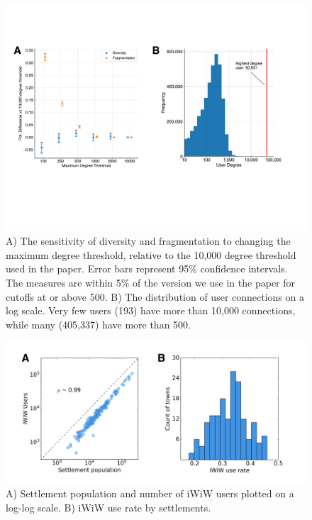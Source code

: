 \begin{figure}[b]
\centering
  \includegraphics[width=\textwidth]{images/iwiw/robustness_tests.pdf}
  \caption[Sensitivity of social capital network measures to thresholds.]{A) The sensitivity of diversity and fragmentation to changing the maximum degree threshold, relative to the 10,000 degree threshold used in the paper. Error bars represent 95\% confidence intervals. The measures are within 5\% of the version we use in the paper for cutoffs at or above 500. B) The distribution of user connections on a log scale. Very few users (193) have more than 10,000 connections, while many (405,337) have more than 500.}
  \label{fig:iwiw_robustness}
\end{figure}

\begin{figure}
\centering
  \includegraphics[width=\textwidth]{images/iwiw/pop_rate_dists_cropped.png}
  \caption[iWiW usage distributions.]{A) Settlement population and number of iWiW users plotted on a log-log scale. B) iWiW use rate by settlements.}
  \label{fig:iwiw_stats}
\end{figure}



